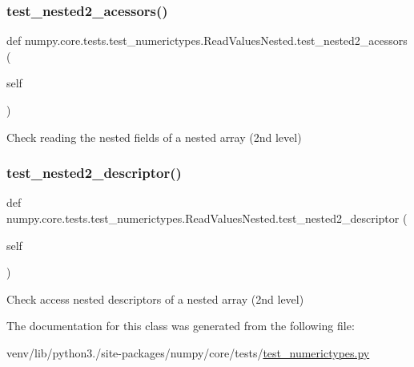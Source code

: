 \subsubsection{\texorpdfstring{test\+\_\+nested2\+\_\+acessors()}{test\_nested2\_acessors()}}
{\footnotesize\ttfamily def numpy.\+core.\+tests.\+test\+\_\+numerictypes.\+Read\+Values\+Nested.\+test\+\_\+nested2\+\_\+acessors (\begin{DoxyParamCaption}\item[{}]{self }\end{DoxyParamCaption})}

\begin{DoxyVerb}Check reading the nested fields of a nested array (2nd level)\end{DoxyVerb}
 \mbox{\label{classnumpy_1_1core_1_1tests_1_1test__numerictypes_1_1ReadValuesNested_a716cf410cac5e04402ec949990206711}} 
\subsubsection{\texorpdfstring{test\+\_\+nested2\+\_\+descriptor()}{test\_nested2\_descriptor()}}
{\footnotesize\ttfamily def numpy.\+core.\+tests.\+test\+\_\+numerictypes.\+Read\+Values\+Nested.\+test\+\_\+nested2\+\_\+descriptor (\begin{DoxyParamCaption}\item[{}]{self }\end{DoxyParamCaption})}

\begin{DoxyVerb}Check access nested descriptors of a nested array (2nd level)\end{DoxyVerb}
 

The documentation for this class was generated from the following file\+:\begin{DoxyCompactItemize}
\item 
venv/lib/python3./site-\/packages/numpy/core/tests/\hyperlink{test__numerictypes_8py}{test\+\_\+numerictypes.\+py}\end{DoxyCompactItemize}
